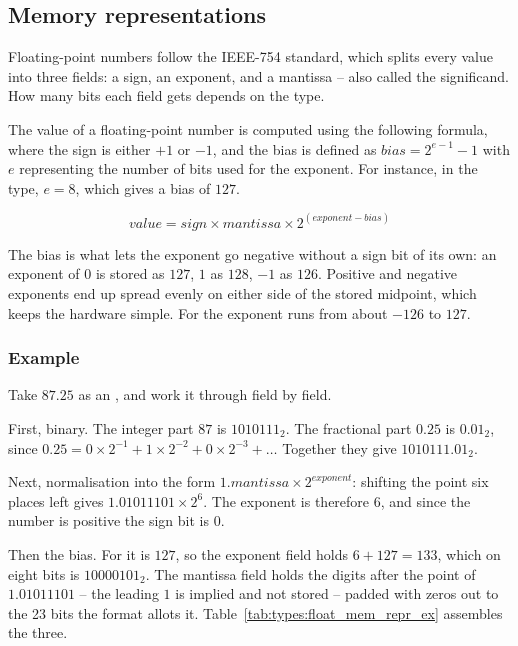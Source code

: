 \subsection{Memory representations}

Floating-point numbers follow the IEEE-754 standard, which splits every value
into three fields: a sign, an exponent, and a mantissa -- also called the
significand. How many bits each field gets depends on the type.



The value of a floating-point number is computed using the following formula,
where the sign is either $+1$ or $-1$, and the bias is defined as $bias =
2^{e-1} - 1$ with $e$ representing the number of bits used for the exponent. For
instance, in the  type, $e = 8$, which gives a bias of $127$.

\begin{equation*}
  value = sign \times mantissa \times 2^{(exponent - bias)}
\end{equation*}

The bias is what lets the exponent go negative without a sign bit of its own: an
exponent of $0$ is stored as $127$, $1$ as $128$, $-1$ as $126$. Positive and
negative exponents end up spread evenly on either side of the stored midpoint,
which keeps the hardware simple. For  the exponent runs from about
$-126$ to $127$.

\subsubsection{Example}

Take $87.25$ as an , and work it through field by field.

First, binary. The integer part $87$ is $1010111_2$. The fractional part $0.25$
is $0.01_2$, since $0.25 = 0 \times 2^{-1} + 1 \times 2^{-2} + 0 \times 2^{-3} +
\ldots$ Together they give $1010111.01_2$.

Next, normalisation into the form $1.mantissa \times 2^{exponent}$: shifting the
point six places left gives $1.01011101 \times 2^{6}$. The exponent is therefore
$6$, and since the number is positive the sign bit is $0$.

Then the bias. For  it is $127$, so the exponent field holds $6 + 127
= 133$, which on eight bits is $10000101_2$. The mantissa field holds the digits
after the point of $1.01011101$ -- the leading $1$ is implied and not stored --
padded with zeros out to the 23 bits the format allots it.
Table~\ref{tab:types:float_mem_repr_ex} assembles the three.

